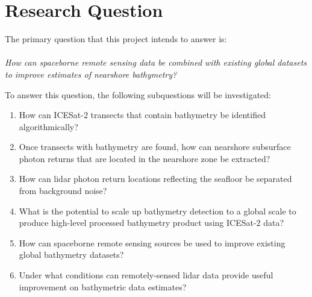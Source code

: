 \section{Research Question}
The primary question that this project intends to answer is: \\
\\
\textit{How can spaceborne remote sensing data be combined with existing global datasets to improve estimates of nearshore bathymetry?} 

To answer this question, the following subquestions will be investigated:

\begin{enumerate} 
      \item How can ICESat-2 transects that contain bathymetry be identified algorithmically?
      \item Once transects with bathymetry are found, how can nearshore subsurface photon returns that are located in the nearshore zone be extracted?
      \item How can lidar photon return locations reflecting the seafloor be separated from background noise?
      \item What is the potential to scale up bathymetry detection to a global scale to produce high-level processed bathymetry product using ICESat-2 data?
      \item How can spaceborne remote sensing sources be used to improve existing global bathymetry datasets?
      \item Under what conditions can remotely-sensed lidar data provide useful improvement on bathymetric data estimates?
\end{enumerate}
